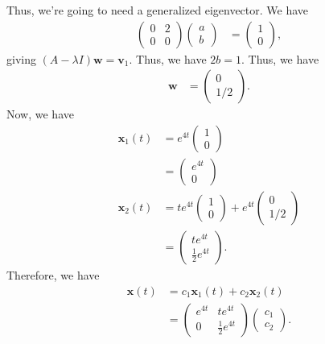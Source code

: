 \documentclass[10pt]{mypackage}
\begin{document}
\begin{example}
  Thus, we're going to need a generalized eigenvector. We have
  \begin{align*}
    \begin{pmatrix}0 & 2 \\ 0 & 0\end{pmatrix} \begin{pmatrix}a\\b\end{pmatrix} &= \begin{pmatrix}1\\0\end{pmatrix},
  \end{align*}
  giving $\left( A - \lambda I \right)\mathbf{w} = \mathbf{v}_1$. Thus, we have $2b = 1$. Thus, we have
  \begin{align*}
    \mathbf{w} &= \begin{pmatrix}0\\1/2\end{pmatrix}.
  \end{align*}
  Now, we have
  \begin{align*}
    \mathbf{x}_1(t) &= e^{4t}\begin{pmatrix}1\\0\end{pmatrix}\\
                    &= \begin{pmatrix}e^{4t} \\ 0\end{pmatrix}\\
    \mathbf{x}_2 (t) &= te^{4t} \begin{pmatrix}1\\0\end{pmatrix} + e^{4t} \begin{pmatrix}0\\1/2\end{pmatrix}\\
                     &= \begin{pmatrix}te^{4t}\\\frac{1}{2}e^{4t}\end{pmatrix}.
  \end{align*}
  Therefore, we have
  \begin{align*}
    \mathbf{x}(t) &= c_1 \mathbf{x}_1(t) + c_2\mathbf{x}_2(t)\\
                  &= \begin{pmatrix}e^{4t} & te^{4t} \\ 0 & \frac{1}{2}e^{4t}\end{pmatrix} \begin{pmatrix}c_1\\c_2\end{pmatrix}.

\end{align*}
\end{example}
\end{document}
